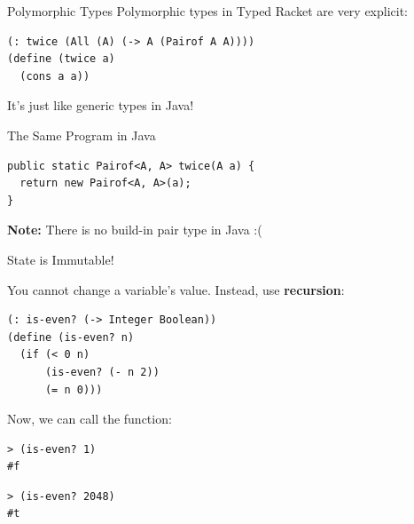 \documentclass{beamer}
\begin{document}
\begin{frame}[fragile]{Polymorphic Types}
Polymorphic types in Typed Racket are very explicit:

\begin{lstlisting}
(: twice (All (A) (-> A (Pairof A A))))
(define (twice a)
  (cons a a))
\end{lstlisting}

\pause{}

\vspace{0.5cm}


\vspace{1cm}

\pause{}

It's just like generic types in Java!
\end{frame}

\begin{frame}[fragile]{The Same Program in Java}
\begin{lstlisting}[style=Java]
public static Pairof<A, A> twice(A a) {
  return new Pairof<A, A>(a);
}
\end{lstlisting}

\vspace{1.5cm}

\textbf{Note:} There is no build-in pair type in Java :(
\end{frame}

\begin{frame}[fragile]{State is Immutable!}

You cannot change a variable's value. Instead, use \textbf{recursion}:

\begin{lstlisting}
(: is-even? (-> Integer Boolean))
(define (is-even? n)
  (if (< 0 n)
      (is-even? (- n 2))
      (= n 0)))
\end{lstlisting}

\pause{}

Now, we can call the function:

\begin{lstlisting}
> (is-even? 1)
#f
\end{lstlisting}
\pause{}
\begin{lstlisting}
> (is-even? 2048)
#t
\end{lstlisting}
\end{frame}
\end{document}
